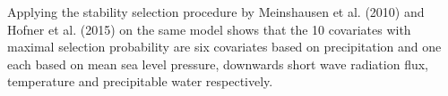 \documentclass[american,foldmarks=false,noconfig]{uibklttr}
\begin{document}


Applying the stability selection procedure by Meinshausen et al. (2010) and
Hofner et al. (2015) on the same model shows that the 10 covariates with 
maximal selection probability are six covariates based on precipitation and 
one each based on mean sea level pressure, downwards short wave radiation 
flux, temperature and precipitable water respectively.

\end{document}
